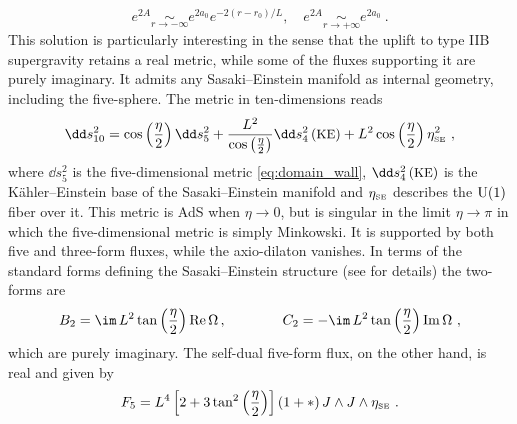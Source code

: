 \begin{enumerate}
\begin{equation}
	e^{2A} \underset{r\to-\infty}{\sim} e^{2a_0}e^{-2(r-r_0)/L},\quad e^{2A} \underset{r\to +\infty}{\sim} e^{2a_0}\ .
\end{equation}
This solution is particularly interesting in the sense that the uplift to type IIB supergravity \cite{Gubser:2009qm,Cassani:2010uw,Gauntlett:2010vu} retains a real metric, while some of the fluxes supporting it are purely imaginary. It admits any Sasaki--Einstein manifold as internal geometry, including the five-sphere. The metric in ten-dimensions reads 
\begin{align}
\dd s^2_{10}=\cos\left(\frac{\eta}{2}\right)\dd s_5^2+\frac{L^2}{\cos\left(\frac{\eta}{2}\right)}\dd s_4^2\left(\text{\small KE}\right)+L^2\cos\left(\frac{\eta}{2}\right)\eta_{\text{\tiny SE}}^2\ ,
\end{align}
where $\dd s_5^2$ is the five-dimensional metric \eqref{eq:domain_wall}, $\dd s_4^2\left(\text{\small KE}\right)$ is the K\"ahler--Einstein base of the Sasaki--Einstein manifold and $\eta_{\text{\tiny SE}}$ describes the ${\rm U(1)}$ fiber over it. This metric is AdS when $\eta\to0$, but is singular in the limit $\eta\to \pi$ in which the five-dimensional metric is simply Minkowski. It is supported by both five and three-form fluxes, while the axio-dilaton vanishes. In terms of the standard forms defining the Sasaki--Einstein structure (see \cite{Gubser:2009qm,Cassani:2010uw,Gauntlett:2010vu} for details) the two-forms are
\begin{align}
B_2=\im\, L^2\tan\left(\frac{\eta}{2}\right){\rm Re}\,\Omega\,,\qquad\qquad C_2=-\im\,L^2\tan\left(\frac{\eta}{2}\right){\rm Im}\,\Omega\ ,
\end{align}
which are purely imaginary. The self-dual five-form flux, on the other hand, is real and given by
\begin{align}
F_5=L^4\left[2+3\tan^2\left(\frac{\eta}{2}\right)\right]\left(1+*\right)J\wedge J\wedge\eta_{\text{\tiny SE}}\ .
\end{align}


\end{enumerate}
